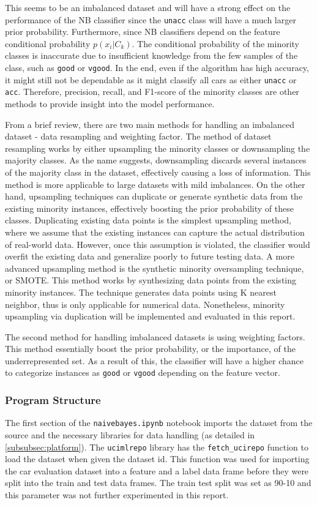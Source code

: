 \documentclass[a4paper]{article}
\begin{document}
This seems to be an imbalanced dataset and will have a strong effect on the performance of the NB classifier since the \lstinline{unacc} class will have a much larger prior probability. Furthermore, since NB classifiers depend on the feature conditional probability $p(x_i|C_k)$. The conditional probability of the minority classes is inaccurate due to insufficient knowledge from the few samples of the class, such as \lstinline{good} or \lstinline{vgood}. In the end, even if the algorithm has high accuracy, it might still not be dependable as it might classify all cars as either \lstinline{unacc} or \lstinline{acc}. Therefore, precision, recall, and F1-score of the minority classes are other methods to provide insight into the model performance.

From a brief review, there are two main methods for handling an imbalanced dataset - data resampling and weighting factor.
The method of dataset resampling works by either upsampling the minority classes or downsampling the majority classes. As the name suggests, downsampling discards several instances of the majority class in the dataset, effectively causing a loss of information. This method is more applicable to large datasets with mild imbalances. On the other hand, upsampling techniques can duplicate or generate synthetic data from the existing minority instances, effectively boosting the prior probability of these classes. Duplicating existing data points is the simplest upsampling method, where we assume that the existing instances can capture the actual distribution of real-world data. However, once this assumption is violated, the classifier would overfit the existing data and generalize poorly to future testing data. A more advanced upsampling method is the synthetic minority oversampling technique, or SMOTE. This method works by synthesizing data points from the existing minority instances. The technique generates data points using K nearest neighbor, thus is only applicable for numerical data. Nonetheless, minority upsampling via duplication will be implemented and evaluated in this report.

The second method for handling imbalanced datasets is using weighting factors. This method essentially boost the prior probability, or the importance, of the underrepresented set. As a result of this, the classifier will have a higher chance to categorize instances as \lstinline{good} or \lstinline{vgood} depending on the feature vector.

\subsubsection{Program Structure}
The first section of the \lstinline{naivebayes.ipynb} notebook imports the dataset from the source and the necessary libraries for data handling (as detailed in \ref{subsubsec:platform}). The \lstinline{ucimlrepo} library has the \lstinline{fetch_ucirepo} function to load the dataset when given the dataset id. This function was used for importing the car evaluation dataset into a feature and a label data frame before they were split into the train and test data frames. The train test split was set as 90-10 and this parameter was not further experimented in this report.
\end{document}
